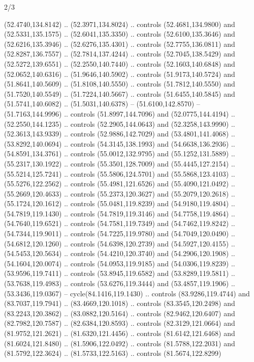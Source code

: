\begin{flagdescription}{2/3}
\begin{scope}[shift={(0.5\flaglength,0.5)},scale=\flagwidth/320]
\begin{scope}[y=0.8pt, x=0.8pt, yscale=-1,shift={(-118.3,-146)}]
  (52.4740,134.8142) .. (52.3971,134.8024) .. controls (52.4681,134.9800) and
  (52.5331,135.1575) .. (52.6041,135.3350) .. controls (52.6100,135.3646) and
  (52.6216,135.3946) .. (52.6276,135.4301) .. controls (52.7755,136.0811) and
  (52.8287,136.7557) .. (52.7814,137.4244) .. controls (52.7045,138.5429) and
  (52.5272,139.6551) .. (52.2550,140.7440) .. controls (52.1603,140.6848) and
  (52.0652,140.6316) .. (51.9646,140.5902) .. controls (51.9173,140.5724) and
  (51.8641,140.5609) .. (51.8108,140.5550) .. controls (51.7812,140.5550) and
  (51.7520,140.5549) .. (51.7224,140.5667) .. controls (51.6455,140.5845) and
  (51.5741,140.6082) .. (51.5031,140.6378) -- (51.6100,142.8570) --
  (51.7163,144.9996) .. controls (51.8997,144.7096) and (52.0775,144.4194) ..
  (52.2550,144.1235) .. controls (52.2905,144.0643) and (52.3258,143.9990) ..
  (52.3613,143.9339) .. controls (52.9886,142.7029) and (53.4801,141.4068) ..
  (53.8292,140.0694) .. controls (54.3145,138.1993) and (54.6638,136.2936) ..
  (54.8591,134.3761) .. controls (55.0012,132.9795) and (55.1252,131.5889) ..
  (55.2317,130.1922) .. controls (55.3501,128.7009) and (55.4445,127.2154) ..
  (55.5214,125.7241) .. controls (55.5806,124.5701) and (55.5868,123.4103) ..
  (55.5276,122.2562) .. controls (55.4981,121.6526) and (55.4090,121.0492) ..
  (55.2669,120.4633) .. controls (55.2373,120.3627) and (55.2079,120.2618) ..
  (55.1724,120.1612) .. controls (55.0481,119.8239) and (54.9180,119.4804) ..
  (54.7819,119.1430) .. controls (54.7819,119.3146) and (54.7758,119.4864) ..
  (54.7640,119.6521) .. controls (54.7581,119.7349) and (54.7462,119.8242) ..
  (54.7344,119.9011) .. controls (54.7225,119.9780) and (54.7049,120.0490) ..
  (54.6812,120.1260) .. controls (54.6398,120.2739) and (54.5927,120.4155) ..
  (54.5453,120.5634) .. controls (54.4210,120.3740) and (54.2906,120.1908) ..
  (54.1604,120.0074) .. controls (54.0953,119.9185) and (54.0306,119.8239) ..
  (53.9596,119.7411) .. controls (53.8945,119.6582) and (53.8289,119.5811) ..
  (53.7638,119.4983) .. controls (53.6276,119.3444) and (53.4857,119.1906) ..
  (53.3436,119.0367) -- cycle(84.1416,119.1430) .. controls (83.9286,119.4744)
  and (83.7037,119.7941) .. (83.4669,120.1018) .. controls (83.3545,120.2498)
  and (83.2243,120.3862) .. (83.0882,120.5164) .. controls (82.9462,120.6407)
  and (82.7982,120.7587) .. (82.6384,120.8593) .. controls (82.3129,121.0664)
  and (81.9752,121.2621) .. (81.6320,121.4456) .. controls (81.6142,121.6468)
  and (81.6024,121.8480) .. (81.5906,122.0492) .. controls (81.5788,122.2031)
  and (81.5792,122.3624) .. (81.5733,122.5163) .. controls (81.5674,122.8299)

\end{scope}
\end{scope}
\end{flagdescription}
